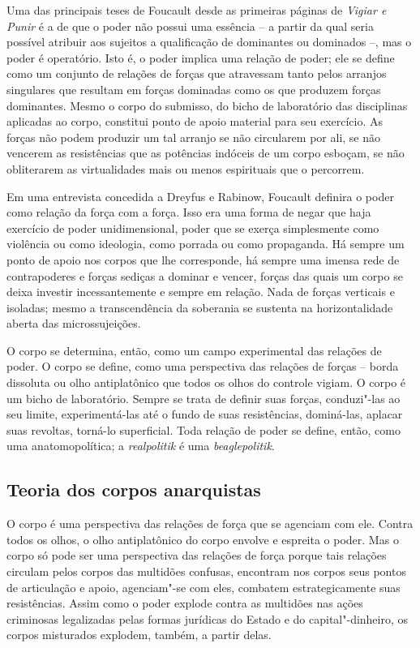 Uma das principais teses de Foucault desde as primeiras páginas de
\emph{Vigiar e Punir} é a de que o poder não possui uma essência -- a
partir da qual seria possível atribuir aos sujeitos a qualificação de
dominantes ou dominados --, mas o poder é operatório. Isto é, o poder
implica uma relação de poder; ele se define como um conjunto de relações
de forças que atravessam tanto pelos arranjos singulares que resultam em
forças dominadas como os que produzem forças dominantes. Mesmo o corpo
do submisso, do bicho de laboratório das disciplinas aplicadas ao corpo,
constitui ponto de apoio material para seu exercício. As forças não
podem produzir um tal arranjo se não circularem por ali, se não vencerem
as resistências que as potências indóceis de um corpo esboçam, se não
obliterarem as virtualidades mais ou menos espirituais que o percorrem.

Em uma entrevista concedida a Dreyfus e Rabinow, Foucault definira o
poder como relação da força com a força. Isso era uma forma de negar que
haja exercício de poder unidimensional, poder que se exerça simplesmente
como violência ou como ideologia, como porrada ou como propaganda. Há
sempre um ponto de apoio nos corpos que lhe corresponde, há sempre uma
imensa rede de contrapoderes e forças sediças a dominar e vencer, forças
das quais um corpo se deixa investir incessantemente e sempre em
relação. Nada de forças verticais e isoladas; mesmo a transcendência da
soberania se sustenta na horizontalidade aberta das microssujeições.

O corpo se determina, então, como um campo experimental das relações de
poder. O corpo se define, como uma perspectiva das relações de forças --
borda dissoluta ou olho antiplatônico que todos os olhos do controle
vigiam. O corpo é um bicho de laboratório. Sempre se trata de definir
suas forças, conduzi"-las ao seu limite, experimentá-las até o fundo de
suas resistências, dominá-las, aplacar suas revoltas, torná-lo
superficial. Toda relação de poder se define, então, como uma
anatomopolítica; a \emph{realpolitik }é uma \emph{beaglepolitik}.

\subsection{Teoria dos corpos anarquistas}

O corpo é uma perspectiva das
relações de força que se agenciam com ele. Contra todos os olhos, o olho
antiplatônico do corpo envolve e espreita o poder. Mas o corpo só pode
ser uma perspectiva das relações de força porque tais relações circulam
pelos corpos das multidões confusas, encontram nos corpos seus pontos de
articulação e apoio, agenciam"-se com eles, combatem estrategicamente
suas resistências. Assim como o poder explode contra as multidões nas
ações criminosas legalizadas pelas formas jurídicas do Estado e do
capital"-dinheiro, os corpos misturados explodem, também, a partir delas.

